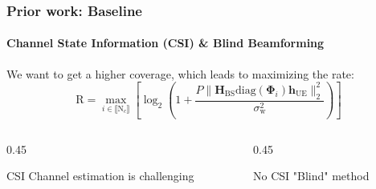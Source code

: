 \documentclass[11pt,aspectratio=1610]{beamer}
\begin{document}
    
    \begin{frame}
        \frametitle{Prior work: Baseline}
        \framesubtitle{Channel State Information (CSI) \& Blind Beamforming}
        \begin{definition}[Rate]
             We want to get a higher coverage, which leads to maximizing the rate:
            \begin{equation*}
                \mathrm{R} 
                = 
                \max_{i \in \llbracket \mathrm N_c \rrbracket} 
                \left [
                    \log_2 \left ( 1+\frac{P \|\mathbf{H}_{\text{BS}} \text{diag}({\boldsymbol{\Phi}_{i}}) \mathbf{h}_{\text{UE}}\|_2^2 }{\sigma_{\mathrm w}^2} \right )
                \right ]
            \end{equation*}
        \end{definition}
        \begin{columns}
             \begin{column}{0.45\textwidth}
                \begin{block}{CSI}
                    Channel estimation is challenging
                \end{block}
            \end{column}
            \begin{column}{0.45\textwidth}
                 \begin{block}{No CSI}
                    "Blind" method
                \end{block}
            \end{column}
        \end{columns}
    \end{frame}

\end{document}
